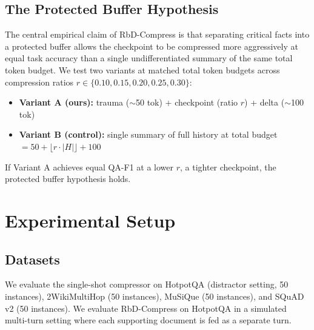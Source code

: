 \documentclass{article}
\begin{document}

\subsection{The Protected Buffer Hypothesis}
\label{sec:protected-buffer}

The central empirical claim of RbD-Compress is that separating critical
facts into a protected buffer allows the checkpoint to be compressed more
aggressively at equal task accuracy than a single undifferentiated summary
of the same total token budget. We test two variants at matched total
token budgets across compression ratios $r \in \{0.10, 0.15, 0.20, 0.25,
0.30\}$:

\begin{itemize}
    \item \textbf{Variant A (ours):} trauma ($\sim$50 tok) + checkpoint
    (ratio $r$) + delta ($\sim$100 tok)
    \item \textbf{Variant B (control):} single summary of full history at
    total budget $= 50 + \lfloor r \cdot |H| \rfloor + 100$
\end{itemize}

If Variant A achieves equal QA-F1 at a lower $r$, a tighter checkpoint,
the protected buffer hypothesis holds.


\section{Experimental Setup}

\subsection{Datasets}
We evaluate the single-shot compressor on HotpotQA \cite{yang2018hotpotqa}
(distractor setting, 50 instances), 2WikiMultiHop \cite{ho2020constructing}
(50 instances), MuSiQue \cite{trivedi2022musique} (50 instances), and
SQuAD v2 \cite{rajpurkar2018know} (50 instances). We evaluate RbD-Compress
on HotpotQA in a simulated multi-turn setting where each supporting
document is fed as a separate turn.
\end{document}
